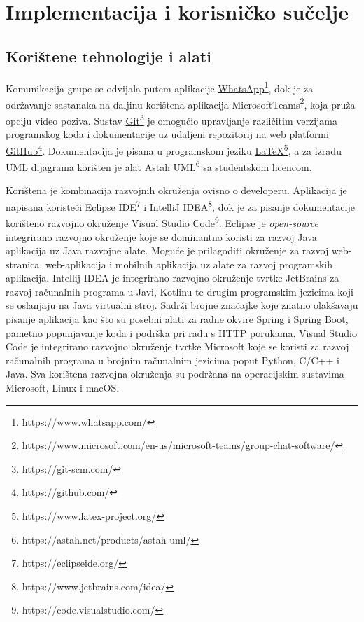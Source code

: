 \chapter{Implementacija i korisničko sučelje}
		
		
		\section{Korištene tehnologije i alati}
		
			\indent \indent Komunikacija grupe se odvijala putem aplikacije \href{https://www.whatsapp.com/}{WhatsApp\footnote{https://www.whatsapp.com/}}, dok je za održavanje sastanaka na daljinu korištena aplikacija \href{https://www.microsoft.com/en-us/microsoft-teams/group-chat-software/}{MicrosoftTeams\footnote{https://www.microsoft.com/en-us/microsoft-teams/group-chat-software/}}, koja pruža opciju video poziva. Sustav \href{https://git-scm.com/}{Git\footnote{https://git-scm.com/}} je omogućio upravljanje različitim verzijama programskog koda i dokumentacije uz udaljeni repozitorij na web platformi \href{https://github.com/}{GitHub\footnote{https://github.com/}}. Dokumentacija je pisana u programskom jeziku \href{https://www.latex-project.org/}{LaTeX\footnote{https://www.latex-project.org/}}, a za izradu UML dijagrama korišten je alat \href{https://astah.net/products/astah-uml/}{Astah UML\footnote{https://astah.net/products/astah-uml/}} sa studentskom licencom.
				
			\indent Korištena je kombinacija razvojnih okruženja ovisno o developeru. Aplikacija je napisana koristeći \href{https://eclipseide.org/}{Eclipse IDE\footnote{https://eclipseide.org/}} i \href{https://www.jetbrains.com/idea/}{IntelliJ IDEA\footnote{https://www.jetbrains.com/idea/}}, dok je za pisanje dokumentacije korišteno razvojno okruženje \href{https://code.visualstudio.com/}{Visual Studio Code\footnote{https://code.visualstudio.com/}}. Eclipse je \textit{open-source} integrirano razvojno okruženje koje se dominantno koristi za razvoj Java aplikacija uz Java razvojne alate. Moguće je prilagoditi okruženje za razvoj web-stranica, web-aplikacija i mobilnih aplikacija uz alate za razvoj programskih aplikacija. Intellij IDEA je integrirano razvojno okruženje tvrtke JetBrains za razvoj računalnih programa u Javi, Kotlinu te drugim programskim jezicima koji se oslanjaju na Java virtualni stroj. Sadrži brojne značajke koje znatno olakšavaju pisanje aplikacija kao što su posebni alati za radne okvire Spring i Spring Boot, pametno popunjavanje koda i podrška pri radu s HTTP porukama. Visual Studio Code je integrirano razvojno okruženje tvrtke Microsoft koje se koristi za razvoj računalnih programa u brojnim računalnim jezicima poput Python, C/C++ i Java. Sva korištena razvojna okruženja su podržana na operacijskim sustavima Microsoft, Linux i macOS. \\
				
